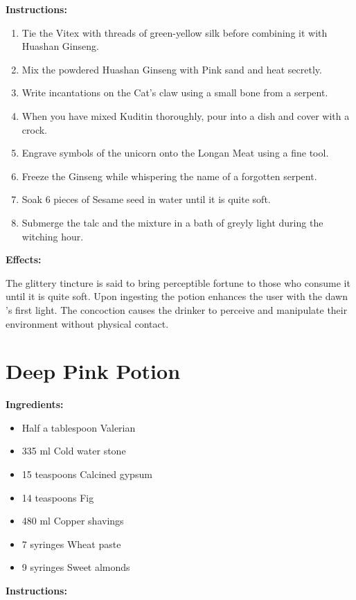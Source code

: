 \documentclass{article}
\begin{document}
\textbf{Instructions:}

\begin{enumerate}
  \item Tie the Vitex with threads of green-yellow silk before combining it with Huashan Ginseng.
  \item Mix the powdered Huashan Ginseng with Pink sand and heat secretly.
  \item Write incantations on the Cat's claw using a small bone from a serpent.
  \item When you have mixed Kuditin thoroughly, pour into a dish and cover with a crock.
  \item Engrave symbols of the unicorn onto the Longan Meat using a fine tool.
  \item Freeze the Ginseng while whispering the name of a forgotten serpent.
  \item Soak 6 pieces of Sesame seed in water until it is quite soft.
  \item Submerge the talc and the mixture in a bath of greyly light during the witching hour.
\end{enumerate}

\textbf{Effects:}

The glittery tincture is said to bring perceptible fortune to those who consume it until it is quite soft. Upon ingesting the potion enhances the user with the dawn 's first light. The concoction causes the drinker to perceive and manipulate their environment without physical contact.

\newpage
\section*{Deep Pink Potion}

\textbf{Ingredients:}

\begin{itemize}
  \item Half a tablespoon Valerian
  \item 335 ml Cold water stone
  \item 15 teaspoons Calcined gypsum
  \item 14 teaspoons Fig
  \item 480 ml Copper shavings
  \item 7 syringes Wheat paste
  \item 9 syringes Sweet almonds
\end{itemize}

\textbf{Instructions:}
\end{document}
